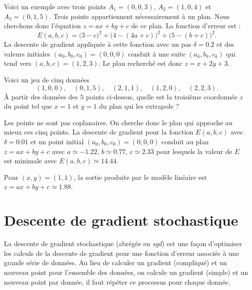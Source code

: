 \documentclass[10pt,class=report,crop=false]{standalone}
\begin{document}
\begin{exemple}
Voici un exemple avec trois points $A_1=(0,0,3)$, $A_2=(1,0,4)$ et $A_3=(0,1,5)$.
Trois points appartiennent nécessairement à un plan. Nous cherchons donc l'équation $z=ax+by+c$ de ce plan.
La fonction d'erreur est :
$$E(a,b,c) = 
\big(3 - c\big)^2
+ \big(4 - (4a+c)\big)^2
+ \big(5 - (b+c)\big)^2.$$
La descente de gradient appliquée à cette fonction avec un pas $\delta = 0.2$ et
des valeurs initiales $(a_0,b_0,c_0)=(0,0,0)$ conduit à une suite $(a_k,b_k,c_k)$ qui tend vers $(a,b,c) = (1,2,3)$. Le plan recherché est donc $z=x+2y+3$.
\end{exemple}


\begin{exemple}
Voici un jeu de cinq données
$$(1,0,0),\quad (0,1,5),\quad (2,1,1),\quad (1,2,0),\quad (2,2,3).$$
\`A partir des données des $5$ points ci-dessus, quelle est la troisième coordonnée $z$ du point tel que $x=1$ et $y=1$ du plan qui les extrapole ?


Les points ne sont pas coplanaires. On cherche donc le plan qui approche au mieux ces cinq points.
La descente de gradient pour la fonction $E(a,b,c)$ avec $\delta=0.01$ et un point initial $(a_0,b_0,c_0)=(0,0,0)$ conduit au plan $z=ax+by+c$ avec $a\simeq-1.22$, $b\simeq0.77$, $c\simeq 2.33$ pour lesquels la valeur de $E$ est minimale avec $E(a,b,c) \simeq 14.44$.

Pour $(x,y) = (1,1)$, la sortie produite par le modèle linéaire est $z = ax+by+c \simeq 1.88$.
\end{exemple}



\section{Descente de gradient stochastique}


La descente de gradient stochastique (abrégée en \emph{sgd}) est une façon d'optimiser les calculs
de la descente de gradient pour une fonction d'erreur associée à une grande série de données.
Au lieu de calculer un gradient (compliqué) et un nouveau point pour l'ensemble des données, on calcule un gradient (simple) et un nouveau point par donnée, il faut répéter ce processus pour chaque donnée.
\end{document}
